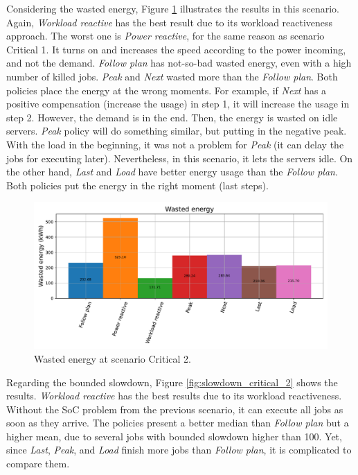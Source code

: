 Considering the wasted energy, Figure \ref{fig:energy_critical_2} illustrates the results in this scenario. Again, \emph{Workload reactive} has the best result due to its workload reactiveness approach. The worst one is \emph{Power reactive}, for the same reason as scenario Critical 1. It turns on and increases the speed according to the power incoming, and not the demand. \emph{Follow plan} has not-so-bad wasted energy, even with a high number of killed jobs. \emph{Peak} and \emph{Next} wasted more than the \emph{Follow plan}. Both policies place the energy at the wrong moments. For example, if \emph{Next} has a positive compensation (increase the usage) in step 1, it will increase the usage in step 2. However, the demand is in the end. Then, the energy is wasted on idle servers. \emph{Peak} policy will do something similar, but putting in the negative peak. With the load in the beginning, it was not a problem for \emph{Peak} (it can delay the jobs for executing later). Nevertheless, in this scenario, it lets the servers idle. On the other hand, \emph{Last} and \emph{Load} have better energy usage than the \emph{Follow plan}. Both policies put the energy in the right moment (last steps).

\begin{figure}[!htb]
    \centering
    \includegraphics[scale=0.55]{Images/Compensations/energy_critical_2.pdf}
    \caption{Wasted energy at scenario Critical 2.}
    \label{fig:energy_critical_2}
\end{figure}

Regarding the bounded slowdown, Figure \ref{fig:slowdown_critical_2} shows the results. \emph{Workload reactive} has the best results due to its workload reactiveness. Without the SoC problem from the previous scenario, it can execute all jobs as soon as they arrive. The policies present a better median than \emph{Follow plan} but a higher mean, due to several jobs with bounded slowdown higher than 100. Yet, since \emph{Last}, \emph{Peak}, and \emph{Load} finish more jobs than \emph{Follow plan}, it is complicated to compare them.

